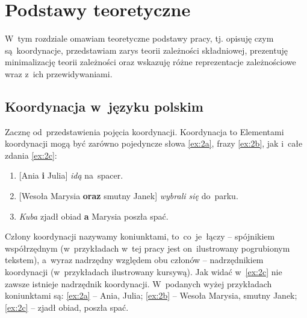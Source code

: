 \documentclass[licencjacka]{pracamgr_Kogni}
\begin{document}
\chapter{Podstawy teoretyczne}
W~tym rozdziale omawiam teoretyczne podstawy pracy, tj. opisuję czym są~koordynacje, przedstawiam zarys teorii zależności składniowej, prezentuję minimalizację teorii zależności oraz wskazuję różne reprezentacje zależnościowe wraz z~ich przewidywaniami.

\section{Koordynacja w~języku polskim}
Zacznę od~przedstawienia pojęcia koordynacji. Koordynacja to %
Elementami koordynacji mogą być zarówno pojedyncze słowa \ref{ex:2a}, frazy \ref{ex:2b}, jak i~całe zdania \ref{ex:2c}:
\begin{exe}
    \ex
    \begin{enumerate}
        \item {[Ania \textbf{i} Julia] \textit{idą} na~spacer.}
            \label {ex:2a}
        \item {[Wesoła Marysia \textbf{oraz} smutny Janek] \textit{wybrali się} do~parku.}
            \label {ex:2b}
        \item {\textit{Kuba} zjadł obiad \textbf{a} Marysia poszła spać.}
            \label {ex:2c}
    \end{enumerate}
    \label{ex:2}
\end{exe}
Człony koordynacji nazywamy koniunktami, to~co~je~łączy -- spójnikiem współrzędnym (w~przykładach w~tej pracy jest on~ilustrowany pogrubionym tekstem), a~wyraz nadrzędny względem obu członów -- nadrzędnikiem koordynacji (w~przykładach ilustrowany kursywą). Jak widać w~\ref{ex:2c} nie zawsze istnieje nadrzędnik koordynacji.
W~podanych wyżej przykładach koniunktami są: \ref{ex:2a} -- Ania, Julia; \ref{ex:2b} -- Wesoła Marysia, smutny Janek; \ref{ex:2c} -- zjadł obiad, poszła spać.
\end{document}
